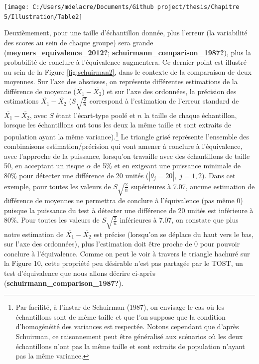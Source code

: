 \documentclass[
  english,
  man]{apa6}
\begin{document}
\begin{flushleft}\texttt{[image: C:/Users/mdelacre/Documents/Github project/thesis/Chapitre 5/Illustration/Table2]} \end{flushleft}

Deuxièmement, pour une taille d'échantillon donnée, plus l'erreur (la variabilité des scores au sein de chaque groupe) sera grande (\textbf{meyners\_equivalence\_2012?}; \textbf{schuirmann\_comparison\_1987?}), plus la probabilité de conclure à l'équivalence augmentera. Ce dernier point est illustré au sein de la Figure \ref{fig:schuirman2}, dans le contexte de la comparaison de deux moyennes. Sur l'axe des abscisses, on représente différentes estimations de la différence de moyenne (\(\bar{X_1}-\bar{X_2}\)) et sur l'axe des ordonnées, la précision des estimations \(\bar{X_1}-\bar{X_2}\) (\(S\sqrt{\frac{2}{n}}\) correspond à l'estimation de l'erreur standard de \(\bar{X_1}-\bar{X_2}\), avec \(S\) étant l'écart-type poolé et \(n\) la taille de chaque échantillon, lorsque les échantillons ont tous les deux la même taille et sont extraits de population ayant la même variance).\footnote{Par facilité, à l'instar de Schuirman (1987), on envisage le cas où les échantillons sont de même taille et que l'on suppose que la condition d'homogénéité des variances est respectée. Notons cependant que d'après Schuirman, ce raisonnement peut être généralisé aux scénarios où les deux échantillons n'ont pas la même taille et sont extraits de population n'ayant pas la même variance.} Le triangle grisé représente l'ensemble des combinaisons estimation/précision qui vont amener à conclure à l'équivalence, avec l'approche de la puissance, lorsqu'on travaille avec des échantillons de taille 50, en acceptant un risque \(\alpha\) de 5\% et en exigeant une puissance minimale de 80\% pour détecter une différence de 20 unités (\(|\theta_j=20|,\;j=1,2\)). Dans cet exemple, pour toutes les valeurs de \(S\sqrt{\frac{2}{n}}\) supérieures à 7.07, aucune estimation de différence de moyennes ne permettra de conclure à l'équivalence (pas même 0) puisque la puissance du test à détecter une différence de 20 unités est inférieure à 80\%. Pour toutes les valeurs de \(S\sqrt{\frac{2}{n}}\) inférieures à 7.07, on constate que plus notre estimation de \(\bar{X_1}-\bar{X_2}\) est précise (lorsqu'on se déplace du haut vers le bas, sur l'axe des ordonnées), plus l'estimation doit être proche de 0 pour pouvoir conclure à l'équivalence. Comme on peut le voir à travers le triangle hachuré sur la Figure 10, cette propriété peu désirable n'est pas partagée par le TOST, un test d'équivalence que nous allons décrire ci-après (\textbf{schuirmann\_comparison\_1987?}).
\end{document}
